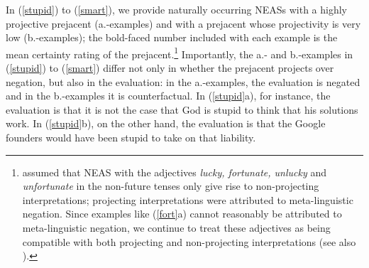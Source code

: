 \documentclass[11pt,fleqn]{article}
\newcommand{\6}{\mbox{$[\hspace*{-.6mm}[$}}
\newcommand{\9}{\mbox{$]\hspace*{-.6mm}]$}}
\begin{document}
In (\ref{stupid}) to (\ref{smart}), we provide naturally occurring NEASs with a highly projective prejacent (a.-examples) and with a prejacent whose projectivity is very low (b.-examples); the bold-faced number included
with each example is the mean certainty rating of the prejacent.\footnote{\citet{karttunen2013}
assumed that NEAS with the  adjectives {\em
lucky, fortunate, unlucky} and {\em unfortunate} in the non-future
tenses only give rise to non-projecting interpretations; projecting
interpretations were attributed to meta-linguistic negation. Since
examples like (\ref{fort}a) cannot reasonably be attributed to
meta-linguistic negation, we continue to treat these adjectives as being compatible with 
both projecting and non-projecting interpretations (see also \citealt{karttunen-etal2014}).} Importantly, the a.- and b.-examples in (\ref{stupid}) to (\ref{smart}) differ not only in whether the prejacent projects over negation, but also in the evaluation: in the a.-examples, the evaluation is negated and in the b.-examples it is counterfactual. In (\ref{stupid}a), for instance, the evaluation is that it is not the case that God is stupid to think that his solutions work. In (\ref{stupid}b), on the other hand, the evaluation is that the Google founders would have been stupid to take on that liability.
 


\end{document}
